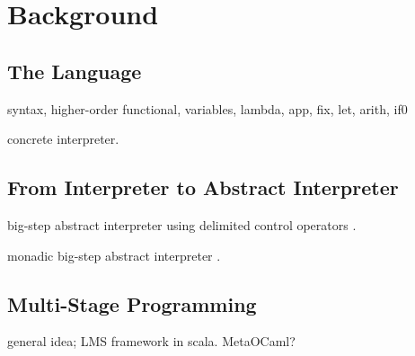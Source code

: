 \section{Background}

\subsection{The Language} \label{bg_lang}

syntax, higher-order functional, variables, lambda, app, fix, let, arith, if0

concrete interpreter.

\subsection{From Interpreter to Abstract Interpreter}

big-step abstract interpreter using delimited control operators \cite{Wei:2018:RAA:3243631.3236800}.

monadic big-step abstract interpreter \cite{DBLP:journals/pacmpl/DaraisLNH17}.

\subsection{Multi-Stage Programming}

general idea; LMS framework in scala. MetaOCaml?
